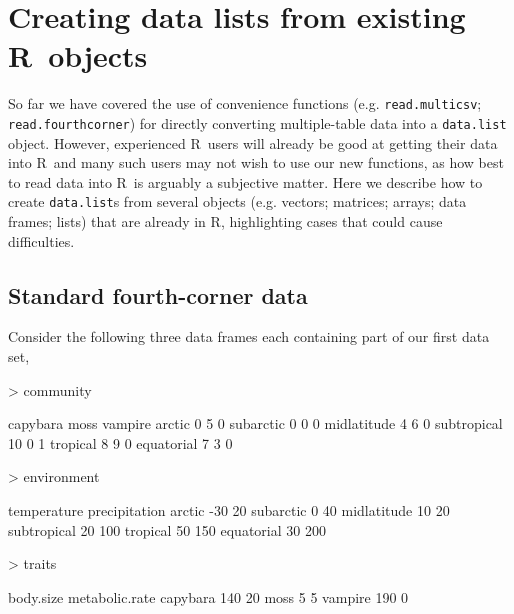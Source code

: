 \documentclass{article}
\newcommand{\R}{{\sf R}}
\newcommand{\code}[1]{\texttt{#1}}
\numberwithin{exercise}{section}
\begin{document}
\section{Creating data lists from existing \R\ objects}

So far we have covered the use of convenience functions (e.g. \code{read.multicsv}; \code{read.fourthcorner}) for directly converting multiple-table data into a \code{data.list} object.  However, experienced \R\ users will already be good at getting their data into \R\ and many such users may not wish to use our new functions, as how best to read data into \R\ is arguably a subjective matter.  Here we describe how to create \code{data.list}s from several objects (e.g. vectors; matrices; arrays; data frames; lists) that are already in \R, highlighting cases that could cause difficulties.

\subsection{Standard fourth-corner data}


Consider the following three data frames each containing part of our first data set,

\begin{Schunk}
\begin{Sinput}
> community
\end{Sinput}
\begin{Soutput}
            capybara moss vampire
arctic             0    5       0
subarctic          0    0       0
midlatitude        4    6       0
subtropical       10    0       1
tropical           8    9       0
equatorial         7    3       0
\end{Soutput}
\begin{Sinput}
> environment
\end{Sinput}
\begin{Soutput}
            temperature precipitation
arctic              -30            20
subarctic             0            40
midlatitude          10            20
subtropical          20           100
tropical             50           150
equatorial           30           200
\end{Soutput}
\begin{Sinput}
> traits
\end{Sinput}
\begin{Soutput}
         body.size metabolic.rate
capybara       140             20
moss             5              5
vampire        190              0
\end{Soutput}
\end{Schunk}
\end{document}
